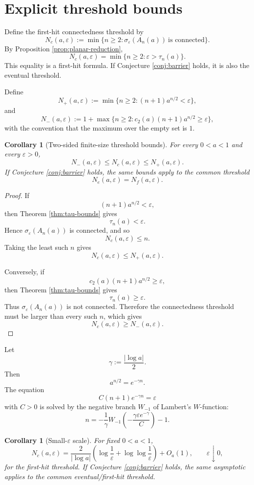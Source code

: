 \documentclass[11pt]{amsart}
\numberwithin{equation}{section}
\newcommand{\eps}{\varepsilon}
\newtheorem{corollary}[theorem]{Corollary}
\begin{document}
\section{Explicit threshold bounds}

Define the first-hit connectedness threshold by
\[
N_c(a,\eps):=\min\{n\ge2:\sigma_\eps(A_n(a))\ \text{is connected}\}.
\]
By Proposition \ref{prop:planar-reduction},
\[
N_c(a,\eps)=\min\{n\ge2:\eps>\tau_n(a)\}.
\]
This equality is a first-hit formula.  If Conjecture \ref{conj:barrier} holds, it is also the eventual threshold.

Define
\[
N_+(a,\eps)
:=
\min\{n\ge2:(n+1)a^{n/2}<\eps\},
\]
and
\[
N_-(a,\eps)
:=
1+\max\{n\ge2:c_2(a)(n+1)a^{n/2}\ge\eps\},
\]
with the convention that the maximum over the empty set is \(1\).

\begin{corollary}[Two-sided finite-size threshold bounds]\label{cor:Nc-bounds}
For every \(0<a<1\) and every \(\eps>0\),
\[
N_-(a,\eps)\le N_c(a,\eps)\le N_+(a,\eps).
\]
If Conjecture \ref{conj:barrier} holds, the same bounds apply to the common threshold
\[
N_e(a,\eps)=N_f(a,\eps).
\]
\end{corollary}

\begin{proof}
If
\[
(n+1)a^{n/2}<\eps,
\]
then Theorem \ref{thm:tau-bounds} gives
\[
\tau_n(a)<\eps.
\]
Hence \(\sigma_\eps(A_n(a))\) is connected, and so
\[
N_c(a,\eps)\le n.
\]
Taking the least such \(n\) gives
\[
N_c(a,\eps)\le N_+(a,\eps).
\]

Conversely, if
\[
c_2(a)(n+1)a^{n/2}\ge\eps,
\]
then Theorem \ref{thm:tau-bounds} gives
\[
\tau_n(a)\ge\eps.
\]
Thus \(\sigma_\eps(A_n(a))\) is not connected.  Therefore the connectedness threshold must be larger than every such \(n\), which gives
\[
N_c(a,\eps)\ge N_-(a,\eps).
\]
\end{proof}

Let
\[
\gamma:=\frac{|\log a|}{2}.
\]
Then
\[
a^{n/2}=e^{-\gamma n}.
\]
The equation
\[
C(n+1)e^{-\gamma n}=\eps
\]
with \(C>0\) is solved by the negative branch \(W_{-1}\) of Lambert's \(W\)-function:
\[
n
=
-\frac1\gamma
W_{-1}\!\left(-\frac{\gamma\eps e^{-\gamma}}{C}\right)-1.
\]

\begin{corollary}[Small-\(\eps\) scale]\label{cor:small-eps}
For fixed \(0<a<1\),
\[
N_c(a,\eps)
=
\frac{2}{|\log a|}
\left(
\log\frac1\eps+\log\log\frac1\eps
\right)
+
O_a(1),
\qquad
\eps\downarrow0,
\]
for the first-hit threshold.  If Conjecture \ref{conj:barrier} holds, the same asymptotic applies to the common eventual/first-hit threshold.
\end{corollary}
\end{document}

